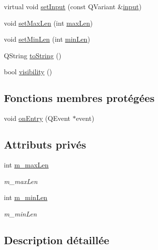 \begin{DoxyCompactItemize}
\item 
virtual void \hyperlink{classSH__QuestionState_ab40b6202090d1afcc965e124b2deb88a}{set\-Input} (const Q\-Variant \&\hyperlink{classSH__InOutState_a8e1b78069343122df7713624a1a5a100}{input})
\item 
void \hyperlink{classSH__StringQuestionState_a7b8ca17302c0953e0ce4a5412f3b96b5}{set\-Max\-Len} (int \hyperlink{classSH__StringQuestionState_a6dce486c3484c28406b234b5f2f91288}{max\-Len})
\item 
void \hyperlink{classSH__StringQuestionState_adf29a14672e2913642f75e61bfed5818}{set\-Min\-Len} (int \hyperlink{classSH__StringQuestionState_a24a95c3ce141e5e26f789720c59d2d3e}{min\-Len})
\item 
Q\-String \hyperlink{classSH__GenericState_a7779babbb40f3f8faa71112204d9804f}{to\-String} ()
\item 
bool \hyperlink{classSH__InOutState_a3a18752c4122c26a2ebf38310c9c1b75}{visibility} ()
\end{DoxyCompactItemize}
\subsection*{Fonctions membres protégées}
\begin{DoxyCompactItemize}
\item 
void \hyperlink{classSH__GenericState_a68c67ef95738e01cd34cd5926f4932fb}{on\-Entry} (Q\-Event $\ast$event)
\end{DoxyCompactItemize}
\subsection*{Attributs privés}
\begin{DoxyCompactItemize}
\item 
int \hyperlink{classSH__StringQuestionState_ac001a12ae5939116282ec21920a8e7d1}{m\-\_\-max\-Len}
\begin{DoxyCompactList}\small\item\em m\-\_\-max\-Len \end{DoxyCompactList}\item 
int \hyperlink{classSH__StringQuestionState_a0efb97212b868551f4d46487fa3b0464}{m\-\_\-min\-Len}
\begin{DoxyCompactList}\small\item\em m\-\_\-min\-Len \end{DoxyCompactList}\end{DoxyCompactItemize}


\subsection{Description détaillée}



